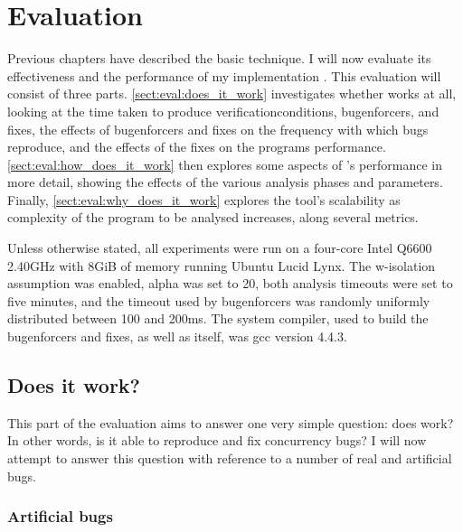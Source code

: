 \newcommand{\biggraph}[1]{}

\chapter{Evaluation}
\label{chapter:eval}

Previous chapters have described the basic {\technique} technique.  I
will now evaluate its effectiveness and the performance of my
implementation {\implementation}.  This evaluation will consist of
three parts.  \autoref{sect:eval:does_it_work} investigates whether
{\technique} works at all, looking at the time taken to produce
\glspl{verificationcondition}, \glspl{bugenforcer}, and fixes, the
effects of \glspl{bugenforcer} and fixes on the frequency with which
bugs reproduce, and the effects of the fixes on the programs
performance.  \autoref{sect:eval:how_does_it_work} then explores some
aspects of {\technique}'s performance in more detail, showing the
effects of the various analysis phases and parameters.  Finally,
\autoref{sect:eval:why_does_it_work} explores the tool's scalability
as complexity of the program to be analysed increases, along several
metrics.

Unless otherwise stated, all experiments were run on a four-core Intel
Q6600 2.40GHz with 8GiB of memory running Ubuntu Lucid Lynx.  The
\gls{w-isolation} assumption was enabled, \gls{alpha} was set to 20,
both analysis timeouts were set to five minutes, and the timeout used
by \glspl{bugenforcer} was randomly uniformly distributed between 100
and 200ms.  The system compiler, used to build the \glspl{bugenforcer}
and fixes, as well as {\implementation} itself, was gcc version 4.4.3.

\section{Does it work?}
\label{sect:eval:does_it_work}

This part of the evaluation aims to answer one very simple question:
does {\technique} work?  In other words, is it able to reproduce and
fix concurrency bugs?  I will now attempt to answer this question with
reference to a number of real and artificial bugs.

\subsection{Artificial bugs}
\label{sect:eval:artificial_bugs}

